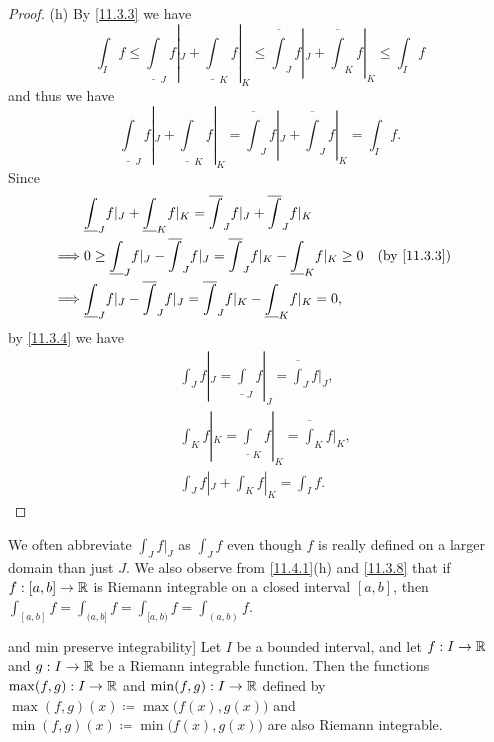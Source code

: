 \begin{proof}{(h)}
  By \cref{11.3.3} we have
  \[
    \int_I f \leq \underline{\int}_J f|_J + \underline{\int}_K f|_K \leq \overline{\int}_J f|_J + \overline{\int}_K f|_K \leq \int_I f
  \]
  and thus we have
  \[
    \underline{\int}_J f|_J + \underline{\int}_K f|_K = \overline{\int}_J f|_J + \overline{\int}_J f|_K = \int_I f.
  \]
  Since
  \begin{align*}
             & \underline{\int}_J f|_J + \underline{\int}_K f|_K = \overline{\int}_J f|_J + \overline{\int}_J f|_K                                \\
    \implies & 0 \geq \underline{\int}_J f|_J - \overline{\int}_J f|_J = \overline{\int}_J f|_K - \underline{\int}_K f|_K \geq 0 &  & \by{11.3.3} \\
    \implies & \underline{\int}_J f|_J - \overline{\int}_J f|_J = \overline{\int}_J f|_K - \underline{\int}_K f|_K = 0,
  \end{align*}
  by \cref{11.3.4} we have
  \begin{align*}
     & \int_J f|_J = \underline{\int}_J f|_J = \overline{\int}_J f|_J, \\
     & \int_K f|_K = \underline{\int}_K f|_K = \overline{\int}_K f|_K, \\
     & \int_J f|_J + \int_K f|_K = \int_I f.
  \end{align*}
\end{proof}

\begin{rmk}\label{11.4.2}
  We often abbreviate \(\int_J f|_J\) as \(\int_J f\) even though \(f\) is really defined on a larger domain than just \(J\).
  We also observe from \cref{11.4.1}(h) and \cref{11.3.8} that if \(f : [a, b] \to \mathbb{R}\) is Riemann integrable on a closed interval \([a, b]\), then \(\int_{[a, b]} f = \int_{(a, b]} f = \int_{[a, b)} f = \int_{(a, b)} f\).
\end{rmk}

\begin{thm} and min preserve integrability]\label{11.4.3}
  Let \(I\) be a bounded interval, and let \(f : I \to \mathbb{R}\) and \(g : I \to \mathbb{R}\) be a Riemann integrable function.
  Then the functions \(\max(f, g) : I \to \mathbb{R}\) and \(\min(f, g) : I \to \mathbb{R}\) defined by \(\max(f, g)(x) \coloneqq \max\big(f(x), g(x)\big)\) and \(\min(f, g)(x) \coloneqq \min\big(f(x), g(x)\big)\) are also Riemann integrable.
\end{thm}


